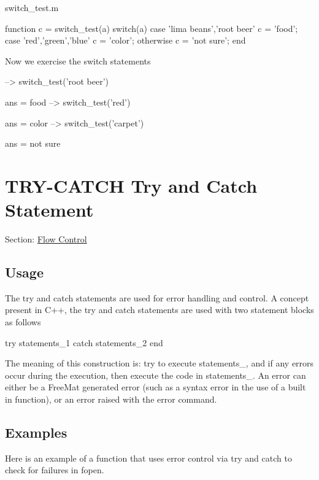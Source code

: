 \begin{DoxyVerb}     switch_test.m
\end{DoxyVerb}



\begin{DoxyVerbInclude}
function c = switch_test(a)
  switch(a)
    case {'lima beans','root beer'}
      c = 'food';
    case {'red','green','blue'}
      c = 'color';
    otherwise
      c = 'not sure';
  end
\end{DoxyVerbInclude}


Now we exercise the switch statements


\begin{DoxyVerbInclude}
--> switch_test('root beer')

ans = 
food
--> switch_test('red')

ans = 
color
--> switch_test('carpet')

ans = 
not sure
\end{DoxyVerbInclude}
 \hypertarget{flow_try}{}\section{T\-R\-Y-\/\-C\-A\-T\-C\-H Try and Catch Statement}\label{flow_try}
Section\-: \hyperlink{sec_flow}{Flow Control} \hypertarget{vtkwidgets_vtkxyplotwidget_Usage}{}\subsection{Usage}\label{vtkwidgets_vtkxyplotwidget_Usage}
The {\ttfamily try} and {\ttfamily catch} statements are used for error handling and control. A concept present in {\ttfamily C++}, the {\ttfamily try} and {\ttfamily catch} statements are used with two statement blocks as follows \begin{DoxyVerb}   try
     statements_1
   catch
     statements_2
   end
\end{DoxyVerb}
 The meaning of this construction is\-: try to execute {\ttfamily statements\-\_}, and if any errors occur during the execution, then execute the code in {\ttfamily statements\-\_}. An error can either be a Free\-Mat generated error (such as a syntax error in the use of a built in function), or an error raised with the {\ttfamily error} command. \hypertarget{variables_matrix_Examples}{}\subsection{Examples}\label{variables_matrix_Examples}
Here is an example of a function that uses error control via {\ttfamily try} and {\ttfamily catch} to check for failures in {\ttfamily fopen}.


